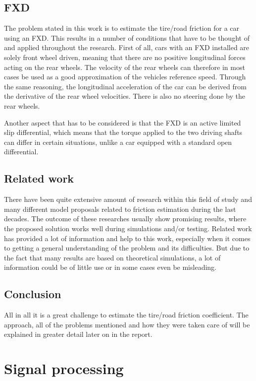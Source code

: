 \subsection{FXD}
The problem stated in this work is to estimate the tire/road friction for a car using an FXD. This results in a number of conditions that have to be thought of and applied throughout the research. First of all, cars with an FXD installed are solely front wheel driven, meaning that there are no positive longitudinal forces acting on the rear wheels. The velocity of the rear wheels can therefore in most cases be used as a good approximation of the vehicles reference speed. Through the same reasoning, the longitudinal acceleration of the car can be derived from the derivative of the rear wheel velocities. There is also no steering done by the rear wheels.

Another aspect that has to be considered is that the FXD is an active limited slip differential, which means that the torque applied to the two driving shafts can differ in certain situations, unlike a car equipped with a standard open differential.

\subsection{Related work}
There have been quite extensive amount of research within this field of study and many different model proposals related to friction estimation during the last decades. The outcome of these researches usually show promising results, where the proposed solution works well during simulations and/or testing. Related work has provided a lot of information and help to this work, especially when it comes to getting a general understanding of the problem and its difficulties. But due to the fact that many results are based on theoretical simulations, a lot of information could be of little use or in some cases even be misleading.

\subsection{Conclusion}
All in all it is a great challenge to estimate the tire/road friction coefficient.  The approach, all of the problems mentioned and how they were taken care of will be explained in greater detail later on in the report.

\section{Signal processing}

